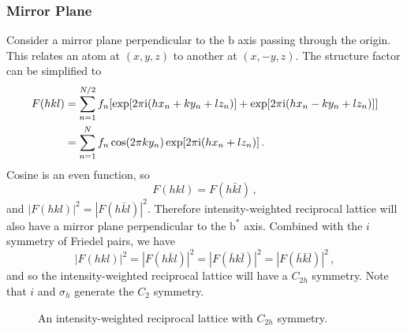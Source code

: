 \documentclass{article}
\theoremstyle{plain}\theoremheaderfont{\normalfont\itshape}\theorembodyfont{\rmfamily}\theoremseparator{.}\newtheorem*{rem}{Remark}\newtheorem*{ex}{Example}\newtheorem*{proof}{Proof}\newtheorem*{altp}{Alternative proof}
\theoremstyle{plain}\theoremheaderfont{\normalfont\bfseries}\theorembodyfont{\rmfamily}\theoremseparator{.}\newtheorem{thm}{Theorem}[section]\newtheorem{lem}[thm]{Lemma}\newtheorem{prop}[thm]{Proposition}\newtheorem*{cor}{Corollary}\newtheorem{defn}[thm]{Definition}\newtheorem{clm}[thm]{Claim}\newtheorem{clminproof}{Claim}\newtheorem*{law}{Law}\newtheorem{pos}[thm]{Postulate}
\theoremstyle{break}\theoremheaderfont{\normalfont\itshape}\theorembodyfont{\rmfamily}\theoremseparator{.\medskip}\newtheorem*{proofskip}{Proof}\newtheorem*{exs}{Examples}\newtheorem*{rems}{Remarks}
\theoremstyle{break}\theoremheaderfont{\normalfont\bfseries}\theorembodyfont{\rmfamily}\theoremseparator{.\medskip}\newtheorem{lemskip}[thm]{Lemma}\newtheorem{defnskip}[thm]{Definition}\newtheorem{propskip}[thm]{Proposition}\newtheorem{thmskip}[thm]{Theorem}
\numberwithin{equation}{section}
\newcommand{\ii}{\mathrm{i}}
\newcommand{\vb}[1]{\bm{\mathrm{#1}}}
\newcommand{\abs}[1]{\left| #1 \right|}
\begin{document}
    \subsubsection{Mirror Plane}
    Consider a mirror plane perpendicular to the \(\vb{b}\) axis passing through the origin. This relates an atom at \((x,y,z)\) to another at \((x,-y,z)\). The structure factor can be simplified to
    \begin{align}
        F(hkl)&=\sum_{n=1}^{N/2}f_n[\exp[2\pi \ii(hx_n+ky_n+lz_n)]+\exp[2\pi \ii(hx_n-ky_n+lz_n)]]\notag \\
        &=\sum_{n=1}^{N}f_n\cos(2\pi ky_n)\exp[2\pi \ii(hx_n+lz_n)]\,.
    \end{align}
    Cosine is an even function, so
    \begin{equation}
        F(hkl)=F(h\bar{k}l)\,,
    \end{equation}
    and \(\abs{F(hkl)}^2=\abs{F(h\bar{k}l)}^2\). Therefore intensity-weighted reciprocal lattice will also have a mirror plane perpendicular to the \(\vb{b}^*\) axis. Combined with the \(i\) symmetry of Friedel pairs, we have
    \begin{equation}
        \abs{F(hkl)}^2=\abs{F(h\bar{k}l)}^2=\abs{F(\bar{h}k\bar{l})}^2=\abs{F(\bar{h}\bar{k}\bar{l})}^2\,,
    \end{equation}
    and so the intensity-weighted reciprocal lattice will have a \(C_{2h}\) symmetry. Note that \(i\) and \(\sigma_h\) generate the \(C_2\) symmetry.

    \begin{figure}
        \centering
        \caption{An intensity-weighted reciprocal lattice with \(C_{2h}\) symmetry.}
    \end{figure}
\end{document}
